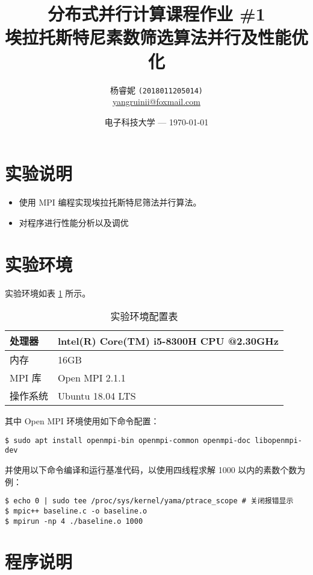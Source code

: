 \documentclass[11pt]{article}
\title{\Large 分布式并行计算课程作业 \#1 \\
  \LARGE 埃拉托斯特尼素数筛选算法并行及性能优化} %
\author{杨睿妮 \texttt{(2018011205014)} \\ \url{yangruinii@foxmail.com}} %
\date{电子科技大学 --- \today} %
\begin{document}
  
  \maketitle %

  \section{实验说明}
  \begin{itemize}
    \item 使用 MPI 编程实现埃拉托斯特尼筛法并行算法。
    \item 对程序进行性能分析以及调优
  \end{itemize}

  \section{实验环境}
  实验环境如表 \ref{tab:env} 所示。
  \begin{table}[htbp]
    \centering
    \caption{实验环境配置表}
    \label{tab:env}
    \begin{tabular}{ll}
      \hline
      处理器 & lntel(R) Core(TM) i5-8300H CPU @2.30GHz \\
      \hline
      内存 & 16GB \\
      \hline
      MPI 库 & Open MPI 2.1.1\\
      \hline
      操作系统 & Ubuntu 18.04 LTS \\
      \hline
    \end{tabular}
  \end{table}
  
  其中 Open MPI 环境使用如下命令配置：
  \begin{commandline}
    \begin{verbatim}
$ sudo apt install openmpi-bin openmpi-common openmpi-doc libopenmpi-dev
    \end{verbatim}
\end{commandline}

并使用以下命令编译和运行基准代码，以使用四线程求解 1000 以内的素数个数为例：
\begin{commandline}
  \begin{verbatim}
$ echo 0 | sudo tee /proc/sys/kernel/yama/ptrace_scope # 关闭报错显示
$ mpic++ baseline.c -o baseline.o
$ mpirun -np 4 ./baseline.o 1000
  \end{verbatim}
\end{commandline}

  \section{程序说明}
\end{document}
